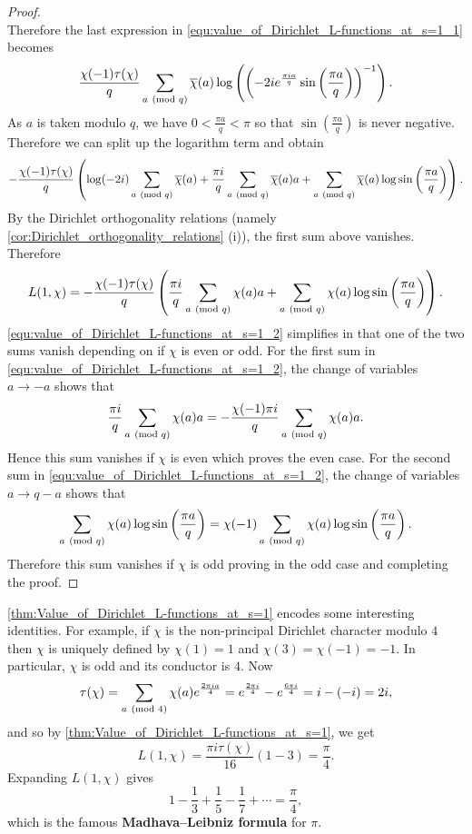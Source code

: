 \begin{proof}
\[      \]
      Therefore the last expression in \cref{equ:value_of_Dirichlet_L-functions_at_s=1_1} becomes
      \[
        \frac{\chi(-1)\tau(\chi)}{q}\sum_{a \ (\mathrm{mod}\text{ }q)}\overline{\chi}(a)\log\left(\left(-2ie^{\frac{\pi ia}{q}}\sin\left(\frac{\pi a}{q}\right)\right)^{-1}\right).
      \]
      As $a$ is taken modulo $q$, we have $0 < \frac{\pi a}{q} < \pi$ so that $\sin\left(\frac{\pi a}{q}\right)$ is never negative. Therefore we can split up the logarithm term and obtain
      \[
        -\frac{\chi(-1)\tau(\chi)}{q}\left(\log(-2i)\sum_{a \ (\mathrm{mod}\text{ }q)}\overline{\chi}(a)+\frac{\pi i}{q}\sum_{a \ (\mathrm{mod}\text{ }q)}\overline{\chi}(a)a+\sum_{a \ (\mathrm{mod}\text{ }q)}\overline{\chi}(a)\log\sin\left(\frac{\pi a}{q}\right)\right).
      \]
      By the Dirichlet orthogonality relations (namely \cref{cor:Dirichlet_orthogonality_relations} (i)), the first sum above vanishes. Therefore
      \begin{equation}\label{equ:value_of_Dirichlet_L-functions_at_s=1_2}
        L(1,\chi) = -\frac{\chi(-1)\tau(\chi)}{q}\left(\frac{\pi i}{q}\sum_{a \ (\mathrm{mod}\text{ }q)}\chi(a)a+\sum_{a \ (\mathrm{mod}\text{ }q)}\chi(a)\log\sin\left(\frac{\pi a}{q}\right)\right).
      \end{equation}
      \cref{equ:value_of_Dirichlet_L-functions_at_s=1_2} simplifies in that one of the two sums vanish depending on if $\chi$ is even or odd. For the first sum in \cref{equ:value_of_Dirichlet_L-functions_at_s=1_2}, the change of variables $a \to -a$ shows that
      \[
        \frac{\pi i}{q}\sum_{a \ (\mathrm{mod}\text{ }q)}\chi(a)a = -\frac{\chi(-1)\pi i}{q}\sum_{a \ (\mathrm{mod}\text{ }q)}\chi(a)a.
      \]
      Hence this sum vanishes if $\chi$ is even which proves the even case. For the second sum in \cref{equ:value_of_Dirichlet_L-functions_at_s=1_2}, the change of variables $a \to q-a$ shows that
      \[
        \sum_{a \ (\mathrm{mod}\text{ }q)}\chi(a)\log\sin\left(\frac{\pi a}{q}\right) = \chi(-1)\sum_{a \ (\mathrm{mod}\text{ }q)}\chi(a)\log\sin\left(\frac{\pi a}{q}\right).
      \]
      Therefore this sum vanishes if $\chi$ is odd proving in the odd case and completing the proof.
    \end{proof}
    
    \begin{remark}
      \cref{thm:Value_of_Dirichlet_L-functions_at_s=1} encodes some interesting identities. For example, if $\chi$ is the non-principal Dirichlet character modulo $4$ then $\chi$ is uniquely defined by $\chi(1) = 1$ and $\chi(3) = \chi(-1) = -1$. In particular, $\chi$ is odd and its conductor is $4$. Now
      \[
        \tau(\chi) = \sum_{a \ (\mathrm{mod}\text{ }4)}\chi(a)e^{\frac{2\pi ia}{4}} = e^{\frac{2\pi i}{4}}-e^{\frac{6\pi i}{4}} = i-(-i) = 2i,
      \]
      and so by \cref{thm:Value_of_Dirichlet_L-functions_at_s=1}, we get
      \[
        L(1,\chi) = \frac{\pi i\tau(\chi)}{16}(1-3) = \frac{\pi}{4}.
      \]
      Expanding $L(1,\chi)$ gives
      \[
        1-\frac{1}{3}+\frac{1}{5}-\frac{1}{7}+\cdots = \frac{\pi}{4},
      \]
      which is the famous \textbf{Madhava–Leibniz formula} for $\pi$.
    \end{remark}

